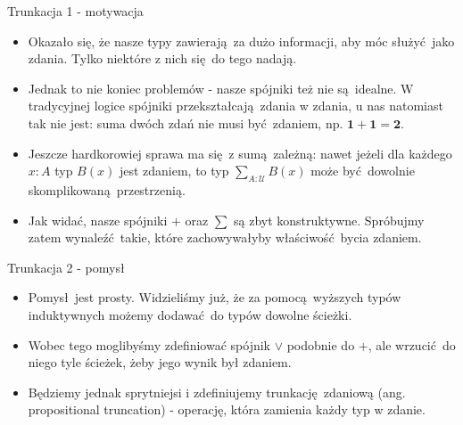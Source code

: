 \documentclass{beamer}
\newcommand{\U}{\mathcal{U}}
\begin{document}
\begin{frame}{Trunkacja 1 - motywacja}
\begin{itemize}
	\item Okazało się, że nasze typy zawierają za dużo informacji, aby móc służyć jako zdania. Tylko niektóre z nich się do tego nadają.
	\item Jednak to nie koniec problemów - nasze spójniki też nie są idealne. W tradycyjnej logice spójniki przekształcają zdania w zdania, u nas natomiast tak nie jest: suma dwóch zdań nie musi być zdaniem, np. $\mathbf{1} + \mathbf{1} = \mathbf{2}$.
	\item Jeszcze hardkorowiej sprawa ma się z sumą zależną: nawet jeżeli dla każdego $x : A$ typ $B(x)$ jest zdaniem, to typ $\sum_{A : \U} B(x)$ może być dowolnie skomplikowaną przestrzenią.
	\item Jak widać, nasze spójniki $+$ oraz $\sum$ są zbyt konstruktywne. Spróbujmy zatem wynaleźć takie, które zachowywałyby właściwość bycia zdaniem.
\end{itemize}
\end{frame}

\begin{frame}{Trunkacja 2 - pomysł}
\begin{itemize}
	\item Pomysł jest prosty. Widzieliśmy już, że za pomocą wyższych typów induktywnych możemy dodawać do typów dowolne ścieżki.
	\item Wobec tego moglibyśmy zdefiniować spójnik $\lor$ podobnie do $+$, ale wrzucić do niego tyle ścieżek, żeby jego wynik był zdaniem.
	\item Będziemy jednak sprytniejsi i zdefiniujemy trunkację zdaniową (ang. propositional truncation) - operację, która zamienia każdy typ w zdanie.
\end{itemize}
\end{frame}
\end{document}
